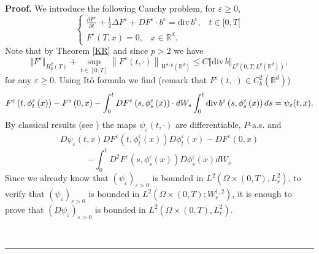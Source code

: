 \documentclass[a4paper,11pt]{article}
\newenvironment{proof}[1][Proof]{\textbf{#1.} }{\ \rule{0.5em}{0.5em}}
\newcommand{\RR}{\mathbb{R}}
\newcommand{\eps}{\varepsilon}
\begin{document}
\begin{proof}
We introduce the following Cauchy problem, for $\eps \ge 0$,
\begin{equation}
\left\{ \begin{aligned} \frac{\partial F^{\eps}}{\partial t}+
\frac{1}{2} \Delta F^{\eps} + D F^{\eps} \cdot b^{\eps}
={\mathrm{div}\, }b^{\eps}, \;\;
\; t \in [0,T[ \\ F^{\eps}(T,x)=0,\;\;\; x \in \mathbb{R} ^d. \end{aligned}%
\right.   \label{equa}
\end{equation}
Note that by Theorem \ref{KR} and since $p> 2$ we have
\begin{equation}
\Vert F^{\eps}\Vert _{{H_{p}^{2}(T)}}
+\sup_{t\in\left[
0,T\right]  }\left\|  F^\eps\left(  t,\cdot\right)  \right\|  _{W^{1,p}(
\mathbb{R}^{d})  }\leq C\Vert
 \mathrm{div}\, b \Vert _{L^{p}(0,T;L^{p}(\mathbb{
R}^{d}))},  \label{bond4}
\end{equation}
for any $\eps \ge 0$. Using It\^{o} formula we find (remark that
 $F^{\eps}(t, \cdot) \in C^{2}_b(\RR^d)$)
\begin{equation*}
F^{\varepsilon }\left( t,{\phi }_{t}^{\varepsilon }\left( x\right)
\right)
-F^{\varepsilon }\left( 0,x\right) -\int_{0}^{t}DF^{\varepsilon }\left( s,{%
\phi }_{s}^{\varepsilon }\left( x\right) \right) \cdot dW_{s}\int_{0}^{t}%
\mathrm{div}\,b^{\varepsilon }\left( s,{\phi }_{s}^{\varepsilon
}\left( x\right) \right) ds = \psi _{\varepsilon }(t,x ).
\end{equation*}
 By classical results (see \cite{K}) the maps $%
\psi _{\varepsilon }(t,\cdot )$ are differentiable, $P$-a.s. and
\begin{align}\label{ci5}
 D\psi_{\varepsilon }(t,x) D F^{\varepsilon } \left( t,{\phi
}_{t}^{\varepsilon }\left( x\right) \right) D{\phi
}_{t}^{\varepsilon }\left( x\right)
 - DF^{\varepsilon
}\left( 0,x\right) \end{align} $$
 - \int_{0}^{t}D^{2}F^{\varepsilon }(s,{\phi }
 _{s}^{\eps}(x)) D{\phi
}_{s}^{\varepsilon }\left( x\right) dW_{s}
$$
Since we already know that $\left( \psi _{\varepsilon }\right)
_{\varepsilon >0}$ is bounded in $L^{2}(\Omega \times
(0,T),L_{r}^{2})$, to verify that $\left( \psi _{\varepsilon
}\right) _{\varepsilon >0}$ is bounded in $L^{2}(\Omega \times
(0,T);W_{r}^{1,2})$, it is enough to prove that  $\left( D\psi
_{\varepsilon }\right) _{\varepsilon >0}$ is bounded in
$L^{2}(\Omega \times (0,T),L_{r}^{2})$.




\end{proof}
\end{document}
